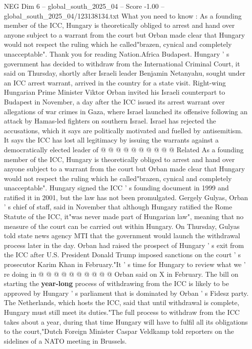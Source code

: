 \begin{textsample}{NEG Dim 6 – global\_south\_2025\_04 – Score -1.00 – global\_south\_2025\_04/123138134.txt}  \label{ex:f6_neg_207}
What you need to know : As a founding member of the ICC, Hungary is theoretically obliged to arrest and hand over anyone subject to a warrant from the court but Orban made clear that Hungary would not respect the ruling which he called"brazen, cynical and completely unacceptable".
Thank you for reading Nation.Africa Budapest.
Hungary ' s government has decided to withdraw from the International Criminal Court, it said on Thursday, shortly after Israeli leader Benjamin Netanyahu, sought under an ICC arrest warrant, arrived in the country for a state visit.
Right-wing Hungarian Prime Minister Viktor Orban invited his Israeli counterpart to Budapest in November, a day after the ICC issued its arrest warrant over allegations of war crimes in Gaza, where Israel launched its offensive following an attack by Hamas-led fighters on southern Israel.
Israel has rejected the accusations, which it says are politically motivated and fuelled by antisemitism.
It says the ICC has lost all legitimacy by issuing the warrants against a democratically elected leader of @ @ @ @ @ @ @ @ @ @ Related As a founding member of the ICC, Hungary is theoretically obliged to arrest and hand over anyone subject to a warrant from the court but Orban made clear that Hungary would not respect the ruling which he called"brazen, cynical and completely unacceptable".
Hungary signed the ICC ' s founding document in 1999 and ratified it in 2001, but the law has not been promulgated.
Gergely Gulyas, Orban ' s chief of staff, said in November that although Hungary ratified the Rome Statute of the ICC, it"was never made part of Hungarian law", meaning that no measure of the court can be carried out within Hungary.
On Thursday, Gulyas told state news agency MTI that the government would launch the withdrawal process later in the day.
Orban had raised the prospect of Hungary ' s exit from the ICC after U.S.
President Donald Trump imposed sanctions on the court ' s prosecutor Karim Khan in February."It ' s time for Hungary to review what we ' re doing in @ @ @ @ @ @ @ @ @ @ Orban said on X in February.
The bill on starting the \textbf{year-long} process of withdrawing from the ICC is likely to be approved by Hungary ' s parliament that is dominated by Orban ' s Fidesz party.
The Netherlands, which hosts the ICC, said that until withdrawal is complete, Hungary must still meet its duties."The full process to withdraw from the ICC takes about a year, during that time Hungary will have to fulfil all its obligations to the court,"Dutch Foreign Minister Caspar Veldkamp told reporters on the sidelines of a NATO meeting in Brussels.

\end{textsample}
